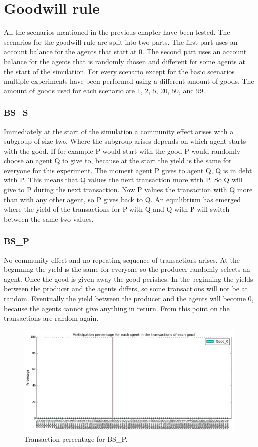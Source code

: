 \documentclass[twoside,openright]{uva-bachelor-thesis}
\begin{document}
\section{Goodwill rule}
All the scenarios mentioned in the previous chapter have been tested. The scenarios for the goodwill rule are split into two parts. The first part uses an account balance for the agents that start at 0. The second part uses an account balance for the agents that is randomly chosen and different for some agents at the start of the simulation. For every scenario except for the basic scenarios multiple experiments have been performed using a different amount of goods. The amount of goods used for each scenario are 1, 2, 5, 20, 50, and 99.
\subsubsection{BS\_S}
Immediately at the start of the simulation a community effect arises with a subgroup of size two. Where the subgroup arises depends on which agent starts with the good. If for example P would start with the good P would randomly choose an agent Q to give to, because at the start the yield is the same for everyone for this experiment. The moment agent P gives to agent Q, Q is in debt with P. This means that Q values the next transaction more with P. So Q will give to P during the next transaction. Now P values the transaction with Q more than with any other agent, so P gives back to Q. An equilibrium has emerged where the yield of the transactions for P with Q and Q with P will switch between the same two values. 

\subsubsection{BS\_P}
No community effect and no repeating sequence of transactions arises. At the beginning the yield is the same for everyone so the producer randomly selects an agent. Once the good is given away the good perishes. In the beginning the yields between the producer and the agents differs, so some transactions will not be at random. Eventually the yield between the producer and the agents will become 0, because the agents cannot give anything in return. From this point on the transactions are random again.
\begin{figure}[h!]
\centering
\includegraphics[scale=0.4]{Simulation2_figures/GR_BS_P/Figure1_4k}
\caption{Transaction percentage for BS\_P.}
\end{figure}
\end{document}
